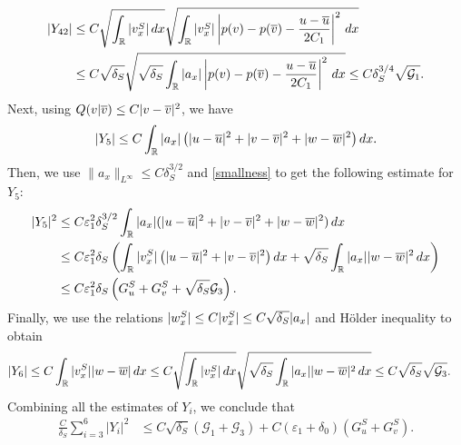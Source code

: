 \documentclass[11pt,reqno]{amsart}
\begin{document}
\begin{align*}
    |Y_{42}| 
    &\le C \sqrt{\int_\mathbb{R} |v^S_x| \, dx} \sqrt{\int_\mathbb{R} |v^S_x| \left| p(v)-p(\overline{v})-\frac{u-\overline{u}}{2C_1} \right|^2 \, dx} \\ 
    &\le C \sqrt{\delta_S} \sqrt{ \sqrt{\delta_S} \int_\mathbb{R} |a_x| \left| p(v)-p(\overline{v})-\frac{u-\overline{u}}{2C_1} \right|^2 \, dx } \le C \delta_S^{3/4} \sqrt{ \mathcal{G}_1 }.
\end{align*}
Next, using $Q(v|\overline{v}) \le C |v-\overline{v}|^2$, we have
\begin{align*}
    |Y_5| \le C\int_\mathbb{R} |a_x| \left( | u-\overline{u}|^2 + |v-\overline{v}|^2 + |w-\overline{w}|^2 \right) dx.
\end{align*}
Then, we use $\|a_x\|_{L^\infty} \le C \delta^{3/2}_S$  and \eqref{smallness} to get the following estimate for $Y_5$:
\begin{align*}
|Y_5|^2 &\le C\varepsilon_1^2\delta_S^{3/2}\int_{\mathbb{R}}|a_x|(|u-\overline{u}|^2+|v-\overline{v}|^2+|w-\overline{w}|^2)\,dx\\
&\le C \varepsilon_1^2 \delta_S\left( \int_\mathbb{R} |v^S_x| \left( |u-\overline{u}|^2 +|v-\overline{v}|^2 \right) dx + \sqrt{\delta_S} \int_\mathbb{R} |a_x| |w-\overline{w}|^2 \, dx \right) \\
& \le C \varepsilon_1^2\delta_S \left( G^S_u+G^S_v + \sqrt{\delta_S} \mathcal{G}_3 \right).
\end{align*}
Finally, we use the relations $|w^S_x| \le C |v^S_x|\le C\sqrt{\delta_S} |a_x|$ and  H\"older inequality to obtain
\begin{align*}
    |Y_{6}| &\le C  \int_\mathbb{R} |v^S_x| |w-\overline{w}| \, dx \le C  \sqrt{\int_\mathbb{R} |v^S_x| \, dx} \sqrt{ \sqrt{\delta_S} \int_\mathbb{R} |a_x| |w-\overline{w}|^2 \, dx} \le C \sqrt{\delta_S} \sqrt{\mathcal{G}_3}. 
\end{align*}
Combining all the estimates of $Y_i$, we conclude that
\begin{equation}\label{est-Y}
    \begin{aligned}
    \frac{C}{\delta_S}\sum_{i=3}^6 |Y_i|^2 &\le C \sqrt{\delta_S} (\mathcal{G}_1 + \mathcal{G}_3) +C \left(\varepsilon_1 +\delta_0 \right) \left( G^S_u+ G^S_v \right).
    \end{aligned}
\end{equation}
	   
\end{document}
